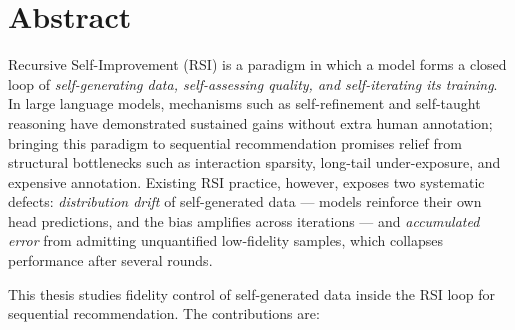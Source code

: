 \chapter*{Abstract}
Recursive Self-Improvement (RSI) is a paradigm in which a model
forms a closed loop of \emph{self-generating data, self-assessing
quality, and self-iterating its training}. In large language models,
mechanisms such as self-refinement and self-taught reasoning have
demonstrated sustained gains without extra human annotation; bringing
this paradigm to sequential recommendation promises relief from
structural bottlenecks such as interaction sparsity, long-tail
under-exposure, and expensive annotation. Existing RSI practice,
however, exposes two systematic defects: \emph{distribution drift}
of self-generated data --- models reinforce their own head
predictions, and the bias amplifies across iterations --- and
\emph{accumulated error} from admitting unquantified low-fidelity
samples, which collapses performance after several rounds.

This thesis studies fidelity control of self-generated data inside
the RSI loop for sequential recommendation. The contributions are:

